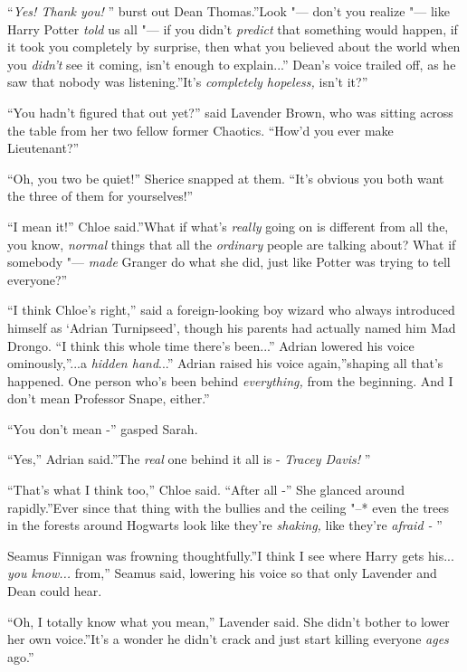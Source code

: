 ``\emph{Yes! Thank you!} '' burst out Dean Thomas.''Look "--- don't you
realize "--- like Harry Potter \emph{told} us all "--- if you didn't
\emph{predict} that something would happen, if it took you completely by
surprise, then what you believed about the world when you \emph{didn't}
see it coming, isn't enough to explain...'' Dean's voice trailed
off, as he saw that nobody was listening.''It's \emph{completely
hopeless,} isn't it?''

``You hadn't figured that out yet?'' said Lavender Brown, who was
sitting across the table from her two fellow former Chaotics. ``How'd
you ever make Lieutenant?''

``Oh, you two be quiet!'' Sherice snapped at them. ``It's obvious you
both want the three of them for yourselves!''

``I mean it!'' Chloe said.''What if what's \emph{really} going on is
different from all the, you know, \emph{normal} things that all the
\emph{ordinary} people are talking about? What if somebody "--- \emph{made}
Granger do what she did, just like Potter was trying to tell everyone?''

``I think Chloe's right,'' said a foreign-looking boy wizard who always
introduced himself as `Adrian Turnipseed', though his parents had
actually named him Mad Drongo. ``I think this whole time there's
been...'' Adrian lowered his voice ominously,''...a
\emph{hidden hand}...'' Adrian raised his voice again,''shaping all
that's happened. One person who's been behind \emph{everything,} from
the beginning. And I don't mean Professor Snape, either.''

``You don't mean -'' gasped Sarah.

``Yes,'' Adrian said.''The \emph{real} one behind it all is -
\emph{Tracey Davis!} ''

``That's what I think too,'' Chloe said. ``After all -'' She glanced
around rapidly.''Ever since that thing with the bullies and the ceiling
"--* even the trees in the forests around Hogwarts look like they're
\emph{shaking,} like they're \emph{afraid -} ''

Seamus Finnigan was frowning thoughtfully.''I think I see where Harry
gets his... \emph{you know...} from,'' Seamus said, lowering
his voice so that only Lavender and Dean could hear.

``Oh, I totally know what you mean,'' Lavender said. She didn't bother
to lower her own voice.''It's a wonder he didn't crack and just start
killing everyone \emph{ages} ago.''


